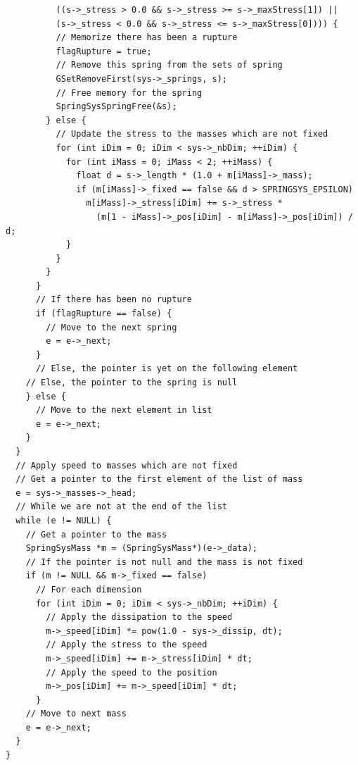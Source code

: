 \documentclass[12pt, a4paper]{article}
\begin{document}
\begin{scriptsize}
\begin{ttfamily}
\begin{lstlisting}
          ((s->_stress > 0.0 && s->_stress >= s->_maxStress[1]) ||
          (s->_stress < 0.0 && s->_stress <= s->_maxStress[0]))) {
          // Memorize there has been a rupture
          flagRupture = true;
          // Remove this spring from the sets of spring
          GSetRemoveFirst(sys->_springs, s);
          // Free memory for the spring
          SpringSysSpringFree(&s);
        } else {
          // Update the stress to the masses which are not fixed
          for (int iDim = 0; iDim < sys->_nbDim; ++iDim) {
            for (int iMass = 0; iMass < 2; ++iMass) {
              float d = s->_length * (1.0 + m[iMass]->_mass);
              if (m[iMass]->_fixed == false && d > SPRINGSYS_EPSILON)
                m[iMass]->_stress[iDim] += s->_stress *
                  (m[1 - iMass]->_pos[iDim] - m[iMass]->_pos[iDim]) / d;
            }
          }
        }
      }
      // If there has been no rupture
      if (flagRupture == false) {
        // Move to the next spring
        e = e->_next;
      }
      // Else, the pointer is yet on the following element
    // Else, the pointer to the spring is null
    } else {
      // Move to the next element in list
      e = e->_next;
    }
  }
  // Apply speed to masses which are not fixed
  // Get a pointer to the first element of the list of mass
  e = sys->_masses->_head;
  // While we are not at the end of the list
  while (e != NULL) {
    // Get a pointer to the mass
    SpringSysMass *m = (SpringSysMass*)(e->_data);
    // If the pointer is not null and the mass is not fixed
    if (m != NULL && m->_fixed == false)
      // For each dimension
      for (int iDim = 0; iDim < sys->_nbDim; ++iDim) {
        // Apply the dissipation to the speed
        m->_speed[iDim] *= pow(1.0 - sys->_dissip, dt);
        // Apply the stress to the speed
        m->_speed[iDim] += m->_stress[iDim] * dt;
        // Apply the speed to the position
        m->_pos[iDim] += m->_speed[iDim] * dt;
      }
    // Move to next mass
    e = e->_next;
  }
}


\end{lstlisting}
\end{ttfamily}
\end{scriptsize}
\end{document}
